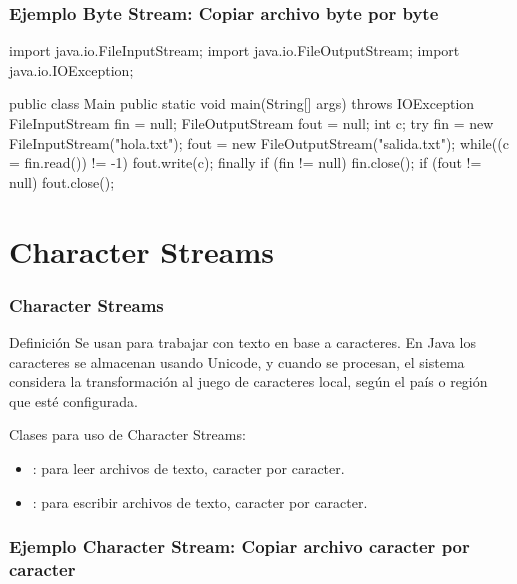 \documentclass{beamer}
\begin{document}
\begin{frame}[fragile]
  \frametitle{Ejemplo Byte Stream: Copiar archivo byte por byte}

  \begin{jsmall}
    import java.io.FileInputStream;
    import java.io.FileOutputStream;
    import java.io.IOException;

    public class Main {
      public static void main(String[] args) throws IOException {
        FileInputStream  fin  = null;
        FileOutputStream fout = null;
        int c;        
        try {
          fin  = new FileInputStream("hola.txt");
          fout = new FileOutputStream("salida.txt");
          while((c = fin.read()) != -1) {
            fout.write(c);
          }
        } finally {
          if (fin != null)  { fin.close(); }
          if (fout != null) { fout.close(); }
        }
      }}    
  \end{jsmall}  
\end{frame}

\section{Character Streams}

\begin{frame}
  \frametitle{Character Streams}

  \begin{block}{Definición}
    Se usan para trabajar con texto en base a caracteres. En Java los
    caracteres se almacenan usando Unicode, y cuando se procesan, el
    sistema considera la transformación al juego de caracteres local,
    según el país o región que esté configurada.
  \end{block}

  Clases para uso de Character Streams:

  \begin{itemize}
    
  \item {}: para leer archivos de texto,
    caracter por caracter.
    
  \item {}: para escribir archivos de texto,
    caracter por caracter.
    
  \end{itemize}
    
\end{frame}

 \frametitle{Ejemplo Character Stream: Copiar archivo caracter por caracter}
\end{document}
